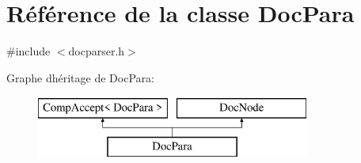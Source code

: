 \hypertarget{class_doc_para}{}\section{Référence de la classe Doc\+Para}
\label{class_doc_para}


{\ttfamily \#include $<$docparser.\+h$>$}

Graphe d\textquotesingle{}héritage de Doc\+Para\+:\begin{figure}[H]
\begin{center}
\leavevmode
\includegraphics[height=2.000000cm]{class_doc_para}
\end{center}
\end{figure}
